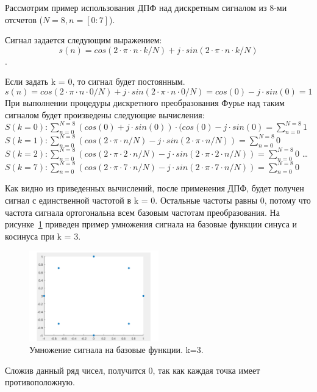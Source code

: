 Рассмотрим пример использования ДПФ над дискретным сигналом из 8-ми отсчетов (\(N = 8, n = [0:7]\)).

Сигнал задается следующим выражением: \[s(n) = cos(2 \cdot \pi \cdot n \cdot k / N) + j \cdot
sin(2 \cdot \pi \cdot n \cdot k / N) \].

Если задать k = 0, то сигнал будет постоянным. \[s(n) = cos(2 \cdot \pi \cdot n \cdot 0 / N) + j \cdot sin(2 \cdot \pi \cdot n \cdot 0 / N) = cos(0) - j \cdot sin(0) = 1\]
При выполнении процедуры дискретного преобразования Фурье над таким сигналом будет произведены
следующие вычисления:\newline
\(S(k = 0): \sum_{n=0}^{N = 8} (cos(0) + j \cdot sin(0)) \cdot (cos(0) - j \cdot sin(0) =
\sum_{n=0}^{N = 8} 1 \) \newline
\(S(k = 1): \sum_{n=0}^{N = 8} (cos(2 \cdot \pi \cdot n/N) - j \cdot sin(2 \cdot \pi\cdot n/N))
=\sum_{n=0}^{N = 8} 0 \) \newline
\(S(k = 2): \sum_{n=0}^{N = 8}  (cos(2 \cdot \pi \cdot 2 \cdot n/N) - j \cdot sin(2 \cdot \pi \cdot
2\cdot n/N)) = \sum_{n=0}^{N = 8} 0 \) \newline
\dots \newline
\(S(k = 7): \sum_{n=0}^{N = 8} (cos(2 \cdot \pi \cdot 7 \cdot n/N) - j \cdot sin(2 \cdot \pi \cdot
7\cdot n/N)) = \sum_{n=0}^{N = 8} 0 \) \newline

Как видно из приведенных вычислений, после применения ДПФ, будет получен сигнал с единственной частотой
в k = 0. Остальные частоты равны 0, потому что частота сигнала ортогональна всем базовым частотам
преобразования. На рисунке~\ref{fig:vol_DFT_k3} приведен пример умножения сигнала на базовые функции
синуса и косинуса при k = 3.
\begin{figure}[H]
    \centering
    \includegraphics[width=0.5\textwidth]{img/vol_DFT_k3}
    \caption{Умножение сигнала на базовые функции. k=3.}
    \label{fig:vol_DFT_k3}
\end{figure}
Сложив данный ряд чисел, получится 0, так как каждая точка имеет противоположную.

